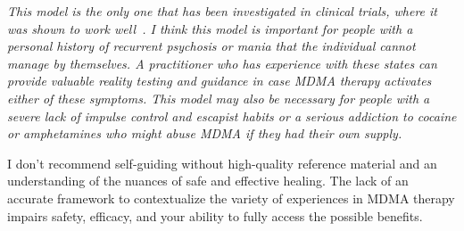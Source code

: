 \documentclass[11pt,oneside]{book}
\let\cite\parencite
\begin{document}
\begin{itemize}
    \textit{This model is the only one that has been investigated in clinical trials, where it was shown to work well~\cite{mitchellMDMAClinicalTrial2}. I think this model is important for people with a personal history of recurrent psychosis or mania that the individual cannot manage by themselves. A practitioner who has experience with these states can provide valuable reality testing and guidance in case MDMA therapy activates either of these symptoms. This model may also be necessary for people with a severe lack of impulse control and escapist habits or a serious addiction to cocaine or amphetamines who might abuse MDMA if they had their own supply.}
\end{itemize}

I don't recommend self-guiding without high-quality reference material and an understanding of the nuances of safe and effective healing. The lack of an accurate framework to contextualize the variety of experiences in MDMA therapy impairs safety, efficacy, and your ability to fully access the possible benefits.

\end{document}
